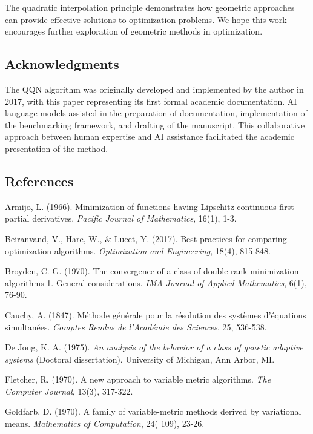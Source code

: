 The quadratic interpolation principle demonstrates how geometric approaches can provide
effective solutions to optimization problems. We hope this work encourages further
exploration of geometric methods in optimization.

\hypertarget{acknowledgments}{%
\subsection{Acknowledgments}\label{acknowledgments}}

The QQN algorithm was originally developed and implemented by the author in 2017, with this paper representing its first formal academic documentation.
AI language models assisted in the preparation of documentation, implementation of the benchmarking framework, and drafting of the manuscript. This collaborative approach between human expertise and AI assistance facilitated the academic presentation of the method.

\hypertarget{references}{%
\subsection{References}\label{references}}

Armijo, L. (1966). Minimization of functions having Lipschitz continuous first partial derivatives. \emph{Pacific Journal of
Mathematics}, 16(1), 1-3.

Beiranvand, V., Hare, W., \& Lucet, Y. (2017). Best practices for comparing optimization algorithms. \emph{Optimization and
Engineering}, 18(4), 815-848.

Broyden, C. G. (1970). The convergence of a class of double-rank minimization algorithms 1. General considerations. \emph{IMA
Journal of Applied Mathematics}, 6(1), 76-90.

Cauchy, A. (1847). Méthode générale pour la résolution des systèmes d'équations simultanées. \emph{Comptes Rendus de
l'Académie des Sciences}, 25, 536-538.

De Jong, K. A. (1975). \emph{An analysis of the behavior of a class of genetic adaptive systems} (Doctoral dissertation).
University of Michigan, Ann Arbor, MI.

Fletcher, R. (1970). A new approach to variable metric algorithms. \emph{The Computer Journal}, 13(3),
317-322.

Goldfarb, D. (1970). A family of variable-metric methods derived by variational means. \emph{Mathematics of Computation}, 24(
109), 23-26.

